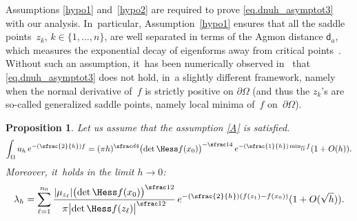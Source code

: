 \documentclass[JEP,XML,SOM,Unicode,NoEqCountersInSection,NoFloatCountersInSection,published]{cedram}
\newcommand{\Psfrac}[2]{(\sfrac{#1}{#2})}
\theoremstyle{plain}
\newtheorem{proposition}{Proposition}
\theoremstyle{definition}
\begin{document}
Assumptions \eqref{hypo1} and~\eqref{hypo2} are required to prove
\eqref{eq.dnuh_asymptot3} with our analysis. In~particular, Assumption~\eqref{hypo1}
ensures that all the saddle points~$z_k$, $k\in\{1,\dots,n\}$, are
well separated in terms of the Agmon distance $\mathsf d_a$, which
measures the exponential decay of eigenforms away from critical
points~\cite{HKN}. Without such an assumption, it~has been numerically
observed in~\cite[\S1.6.2]{DLLN} that
\eqref{eq.dnuh_asymptot3} does not hold, in~a slightly different
framework, namely when the normal derivative of~$f$ is strictly
positive on $\partial \Omega$ (and thus the $z_k$'s are so-called
generalized saddle points, namely local minima
of~$f$ on~$\partial \Omega$).

\begin{proposition}\label{pr.LP-N}
Let us assume that the assumption \ref{A} is satisfied.
\begin{equation}\label{eq.moyenn-uh}
\int_\Omega u_h\, e^{-\Psfrac 2h f}= (\pi h)^{\sfrac d4} \bigl(\det \Hess f(x_0)\bigr)^{-\sfrac 14} \, e^{-\Psfrac{1}{h}\min_{\overline{\Omega}} f} (1+O(h)).
\end{equation}
Moreover, it~holds in the limit $h\to 0$:
\begin{equation}\label{eq.lambda_h-Equiv}
\lambda_h= \sum\limits _{ \ell=1 }^{n_0} \frac{ \vert \mu_{z_\ell}\vert \bigl(\det \Hess f (x_0) \bigr)^{\sfrac12} }{ \pi \bigl\vert \det \Hess f (z_\ell) \bigr\vert^{\sfrac12} }\, e^{-\Psfrac 2h (f(z_1)-f(x_0))} (1+O(\sqrt h)).
\end{equation}
\end{proposition}
\end{document}
